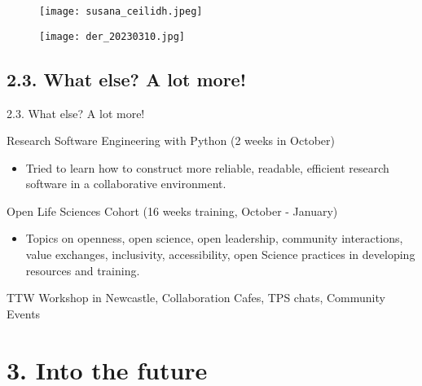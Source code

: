 \documentclass[t]{beamer}
\begin{document}
\begin{frame}
    \begin{figure}
        \vspace{-\blocktitlesize}\texttt{[image: susana\_ceilidh.jpeg]}
    \end{figure}
\end{frame}

\begin{frame}
    \begin{figure}
        \vspace{-\blocktitlesize}\texttt{[image: der\_20230310.jpg]}
    \end{figure}
\end{frame}

\subsection{2.3. What else? A lot more!}
\begin{frame}{2.3. What else? A lot more!}
	\begin{block}{Research Software Engineering with Python (2 weeks in October)}
  		\begin{itemize}    
  			\item Tried to learn how to construct more reliable, readable, efficient research software in a collaborative environment.
  		\end{itemize}    
	\end{block}
 
        \begin{block}{Open Life Sciences Cohort (16 weeks training, October - January)}
  		\begin{itemize}    
  			\item Topics on openness, open science, open leadership, community interactions, value exchanges, inclusivity, accessibility, open Science practices in developing resources and training.
  		\end{itemize}    
	\end{block}

        \begin{block}{TTW Workshop in Newcastle, Collaboration Cafes, TPS chats, Community Events}
	\end{block}

 
\end{frame}

\section{3. Into the future}
\end{document}
